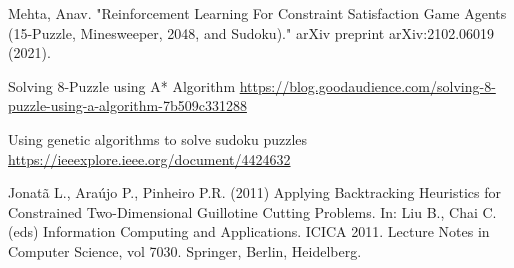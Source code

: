 \documentclass{svproc}
\begin{document}
\begin{thebibliography}{6}
Mehta, Anav. "Reinforcement Learning For Constraint Satisfaction Game Agents (15-Puzzle, Minesweeper, 2048, and Sudoku)." arXiv preprint arXiv:2102.06019 (2021).

Solving 8-Puzzle using A* Algorithm
\url{https://blog.goodaudience.com/solving-8-puzzle-using-a-algorithm-7b509c331288}

Using genetic algorithms to solve sudoku puzzles
\url{https://ieeexplore.ieee.org/document/4424632}

Jonatã L., Araújo P., Pinheiro P.R. (2011) Applying Backtracking Heuristics for Constrained Two-Dimensional Guillotine Cutting Problems. In: Liu B., Chai C. (eds) Information Computing and Applications. ICICA 2011. Lecture Notes in Computer Science, vol 7030. Springer, Berlin, Heidelberg.

\end{thebibliography}
\end{document}
